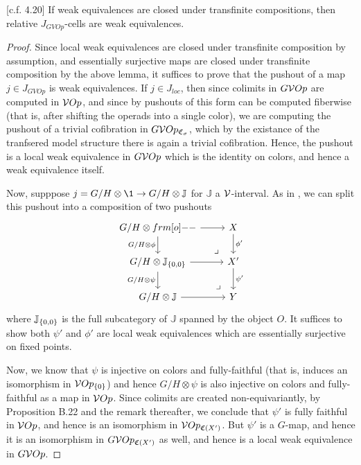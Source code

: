 \documentclass[psamsfonts,onesided,10pt,letterpaper]{amsart}%
\renewcommand{\C}{\ensuremath{\mathfrak{C}}}
\newcommand{\J}{\ensuremath{\mathbb{J}}}
\begin{document}
\begin{lemma}
  \label{J-CELL_LEMMA}
  [c.f. \cite{Cav14} 4.20]
  If weak equivalences are closed under transfinite compositions, then relative $J_{GVOp}$-cells are weak equivalences. 
\end{lemma}
\begin{proof}
  Since local weak equivalences are closed under transfinite composition by assumption, and essentially surjective maps are closed under transfinite composition by the above lemma, it suffices to prove that the pushout of a map $j\in J_{GVOp}$ is weak equivalences. If $j\in J_{loc}$, then since colimits in $G\mathcal V Op$ are computed in $\mathcal V Op$, and since by \cite{Cav14} pushouts of this form can be computed fiberwise (that is, after shifting the operads into a single color), we are computing the pushout of a trivial cofibration in $G\V Op_{\C_{\sigma}}$, which by the existance of the tranfsered model structure there is again a trivial cofibration. Hence, the pushout is a local weak equivalence in $G\mathcal V Op$ which is the identity on colors, and hence a weak equivalence itself.

Now, supppose $j = G/H\otimes \1 \to G/H\otimes \J$ for $\J$ a $\mathcal V$-interval. As in \cite{Cav14}, we can split this pushout into a composition of two pushouts
\[
\begin{tikzcd}
  G/H\otimes \1 \arrow[r] \arrow[d, "G/H\otimes \phi"'] \arrow[dr,phantom, yshift=.1em, xshift=.5em, "\lrcorner" near end] & X \arrow[d,"\phi'"] \\
  G/H\otimes \J_{\set{0,0}} \arrow[r] \arrow[d, "G/H\otimes \psi"'] \arrow[dr,phantom, yshift=.1em, xshift=.5em, "\lrcorner" near end] & X' \arrow[d,"\psi'"]\\
  G/H\otimes \J \arrow[r] & Y
\end{tikzcd}
\]
where $\J_{\set{0,0}}$ is the full subcategory of $\J$ spanned by the object $O$. It suffices to show both $\psi'$ and $\phi'$ are local weak equivalences which are essentially surjective on fixed points. 

Now, we know \cite{Cav14} that $\psi$ is injective on colors and fully-faithful (that is, induces an isomorphism in $\mathcal V Op_{\left\{0\right\}}$) and hence $G/H\otimes\psi$ is also injective on colors and fully-faithful as a map in $\mathcal V Op$. Since colimits are created non-equivariantly, by \cite{Cav14} Proposition B.22 and the remark thereafter, we conclude that $\psi'$ is fully faithful in $\mathcal V Op$, and hence is an isomorphism in $\V Op_{\C(X')}$. But $\psi'$ is a $G$-map, and hence it is an isomorphism in $G\V Op_{\C(X')}$ as well, and hence is a local weak equivalence in $G\mathcal V Op$. 


\end{proof}
\end{document}
